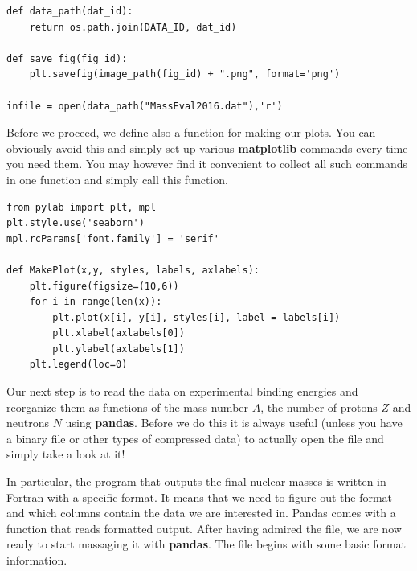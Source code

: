 \documentclass{beamer}
\begin{document}
\begin{frame}
\begin{verbatim}
def data_path(dat_id):
    return os.path.join(DATA_ID, dat_id)

def save_fig(fig_id):
    plt.savefig(image_path(fig_id) + ".png", format='png')

infile = open(data_path("MassEval2016.dat"),'r')

\end{verbatim}


Before we proceed, we define also a function for making our plots. You can obviously avoid this and simply set up various \textbf{matplotlib} commands every time you need them. You may however find it convenient to collect all such commands in one function and simply call this function. 












\begin{verbatim}
from pylab import plt, mpl
plt.style.use('seaborn')
mpl.rcParams['font.family'] = 'serif'

def MakePlot(x,y, styles, labels, axlabels):
    plt.figure(figsize=(10,6))
    for i in range(len(x)):
        plt.plot(x[i], y[i], styles[i], label = labels[i])
        plt.xlabel(axlabels[0])
        plt.ylabel(axlabels[1])
    plt.legend(loc=0)

\end{verbatim}


Our next step is to read the data on experimental binding energies and
reorganize them as functions of the mass number $A$, the number of
protons $Z$ and neutrons $N$ using \textbf{pandas}.  Before we do this it is
always useful (unless you have a binary file or other types of compressed
data) to actually open the file and simply take a look at it!

In particular, the program that outputs the final nuclear masses is written in Fortran with a specific format. It means that we need to figure out the format and which columns contain the data we are interested in. Pandas comes with a function that reads formatted output. After having admired the file, we are now ready to start massaging it with \textbf{pandas}. The file begins with some basic format information.












\end{frame}
\end{document}
